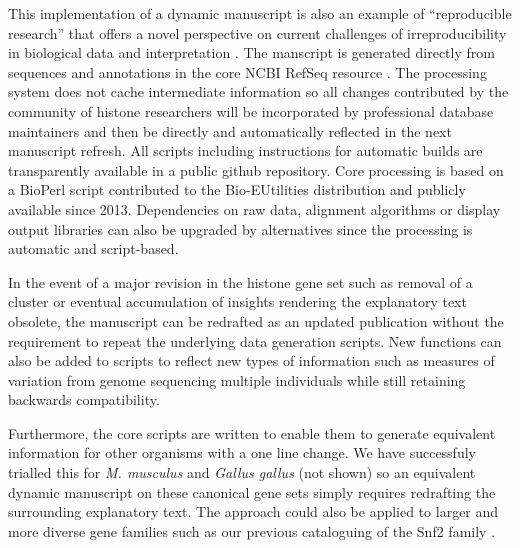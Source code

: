   This implementation of a dynamic manuscript
  is also an example of ``reproducible research'' \citep{reproducible-research-bioinformatics,reproducible-research-law}
  that offers a novel perspective on
  current challenges of irreproducibility in biological data and interpretation \citep{ErrorProne2012,OpenPrograms2012}.
  The manscript is generated directly from sequences and annotations
  in the core NCBI RefSeq resource \citep{PruittRefseq2014}.
  The processing system does not cache intermediate information so all changes contributed by
  the community of histone researchers will be incorporated by professional database maintainers
  and then be directly and automatically reflected in the next manuscript refresh.
  All scripts including instructions for automatic builds
  are transparently available in a public github repository.
  Core processing is based on a BioPerl script contributed to the Bio-EUtilities distribution
  and publicly available since 2013.
  Dependencies on raw data, alignment algorithms or display output libraries
  can also be upgraded by alternatives since the processing is automatic and script-based.

  In the event of a major revision in the histone gene set such as removal of a cluster
  or eventual accumulation of insights rendering the explanatory text obsolete,
  the manuscript can be redrafted as an updated publication
  without the requirement to repeat the underlying data generation scripts.
  New functions can also be added to scripts to reflect new types of information
  such as measures of variation from genome sequencing multiple individuals
  while still retaining backwards compatibility.

  Furthermore, the core scripts are written to enable them to generate
  equivalent information for other organisms with a one line change.
  We have successfuly trialled this for \textit{M. musculus} and \textit{Gallus gallus} (not shown)
  so an equivalent dynamic manuscript on these canonical gene sets
  simply requires redrafting the surrounding explanatory text.
  The approach could also be applied to larger and more diverse gene families such as
  our previous cataloguing of the Snf2 family \citep{andrew-snf2-catalogue}.
